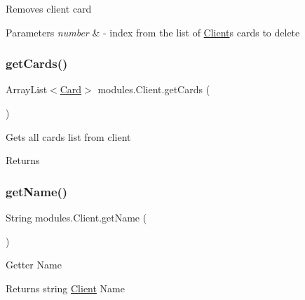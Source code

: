 Removes client card 
\begin{DoxyParams}{Parameters}
{\em number} & -\/ index from the list of \mbox{\hyperlink{classmodules_1_1_client}{Client}}\textquotesingle{}s cards to delete \\
\hline
\end{DoxyParams}
\mbox{\label{classmodules_1_1_client_a4b56c055f3afc28546ea29b9579f79a1}} 
\subsubsection{\texorpdfstring{get\+Cards()}{getCards()}}
{\footnotesize\ttfamily Array\+List$<$\mbox{\hyperlink{classmodules_1_1bank_1_1_card}{Card}}$>$ modules.\+Client.\+get\+Cards (\begin{DoxyParamCaption}{ }\end{DoxyParamCaption})\hspace{0.3cm}{\ttfamily [inline]}}

Gets all cards list from client \begin{DoxyReturn}{Returns}

\end{DoxyReturn}
\mbox{\label{classmodules_1_1_client_afec5499055f7177339a5ff45bbcfff10}} 
\subsubsection{\texorpdfstring{get\+Name()}{getName()}}
{\footnotesize\ttfamily String modules.\+Client.\+get\+Name (\begin{DoxyParamCaption}{ }\end{DoxyParamCaption})\hspace{0.3cm}{\ttfamily [inline]}}

Getter Name \begin{DoxyReturn}{Returns}
string \mbox{\hyperlink{classmodules_1_1_client}{Client}} Name 
\end{DoxyReturn}
\mbox{\label{classmodules_1_1_client_abf135a1873bab2a59572e5208faa6b93}} 
